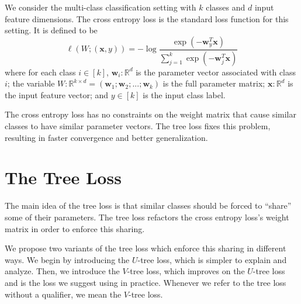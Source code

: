 \documentclass[twoside]{article}
\newcommand{\R}{\mathbb R}
\newcommand{\trans}[1]{{#1}^{T}}
\newcommand{\w}{\mathbf w}
\newcommand{\x}{\mathbf x}
\begin{document}
We consider the multi-class classification setting with $k$ classes and $d$ input feature dimensions.
The cross entropy loss is the standard loss function for this setting.
It is defined to be
\begin{equation}
    \label{eq:xentropy}
    \ell(W;(\x,y)) = - \log \frac {\exp(-\trans\w_y \x)}{\sum_{j=1}^k \exp(-\trans \w_j \x)}
\end{equation}
where for each class $i\in[k]$,
$\w_i : \R^d$ is the parameter vector associated with class $i$;
the variable $W : \R^{k \times d} = (\w_1; \w_2; ...; \w_k)$ is the full parameter matrix;
$\x : \R^d$ is the input feature vector;
and $y \in [k]$ is the input class label.

The cross entropy loss has no constraints on the weight matrix that cause similar classes to have similar parameter vectors.
The tree loss fixes this problem, resulting in faster convergence and better generalization.


\section{The Tree Loss}
\label{sec:tree}

The main idea of the tree loss is that similar classes should be forced to ``share'' some of their parameters.
The tree loss refactors the cross entropy loss's weight matrix in order to enforce this sharing.

We propose two variants of the tree loss which enforce this sharing in different ways.
We begin by introducing the $U$-tree loss,
which is simpler to explain and analyze.
Then, we introduce the $V$-tree loss,
which improves on the $U$-tree loss and is the loss we suggest using in practice.
Whenever we refer to the tree loss without a qualifier,
we mean the $V$-tree loss.


\end{document}
